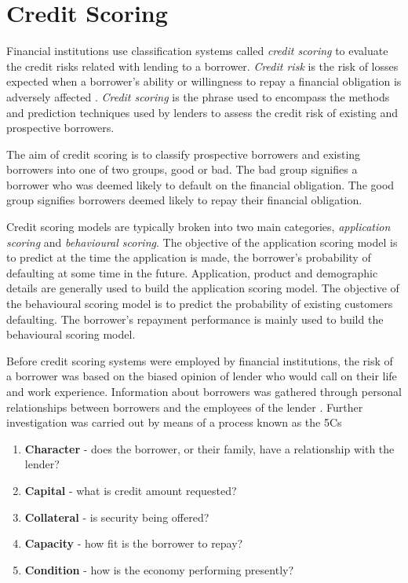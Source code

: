 \section{Credit Scoring}

Financial institutions use classification systems called \textit{credit scoring} to evaluate the credit risks related with lending to a borrower. \textit{Credit risk} is the risk of losses expected when a borrower's ability or willingness to repay a financial obligation is adversely affected \citep{anderson_credit_2007}. \textit{Credit scoring} is the phrase used to encompass the methods and prediction techniques used by lenders to assess the credit risk of existing and prospective borrowers. 

The aim of credit scoring is to classify prospective borrowers and existing borrowers into one of two groups, good or bad. The bad group signifies a borrower who was deemed likely to default on the financial obligation. The good group signifies borrowers deemed likely to repay their financial obligation.

Credit scoring models are typically broken into two main categories, \textit{application scoring} and \textit{behavioural scoring}. The objective of the application scoring model is to predict at the time the application is made, the borrower's probability of defaulting at some time in the future. Application, product and demographic details are generally used to build the application scoring model. The objective of the behavioural scoring model is to predict the probability of existing customers defaulting. The borrower's repayment performance is mainly used to build the behavioural scoring model. 

Before credit scoring systems were employed by financial institutions, the risk of a borrower was based on the biased opinion of lender who would call on their life and work experience. Information about borrowers was gathered through personal relationships between borrowers and the employees of the lender \citep{anderson_credit_2007}. Further investigation was carried out by means of a process known as the 5Cs

\begin{enumerate}
	\renewcommand{\labelenumi}{(\roman{enumi})}  
	\item \textbf{Character} - does the borrower, or their family, have a relationship with the lender?
	\item \textbf{Capital} - what is credit amount requested?
	\item \textbf{Collateral} - is security being offered?
	\item \textbf{Capacity} - how fit is the borrower to repay?
	\item \textbf{Condition} - how is the economy performing presently?
\end{enumerate}

